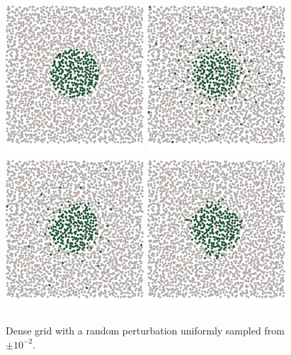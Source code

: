 \documentclass[review,supplement,onefignum,onetabnum]{siamonline220329}
\begin{document}
\begin{figure}[H]
  \centering
  \includegraphics{figures/precompiled/grid_1e-2/points_1.pdf}%
  \quad
  \includegraphics{figures/precompiled/grid_1e-2/points_2.pdf}%
  \quad
  \includegraphics{figures/precompiled/grid_1e-2/points_3.pdf}%
  \quad
  \includegraphics{figures/precompiled/grid_1e-2/points_4.pdf}%
  \caption{
    Dense grid with a random perturbation
    uniformly sampled from \( \pm 10^{-2} \).
  }
\end{figure}
\end{document}
